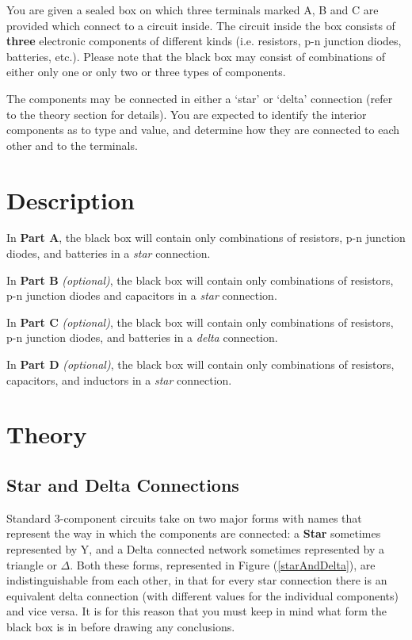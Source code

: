 You are given a sealed box on which three terminals marked A, B and C are provided which connect to a circuit inside. The circuit inside the box consists of \textbf{three} electronic components of different kinds (i.e. resistors, p-n junction diodes, batteries, etc.). Please note that the black box may consist of combinations of either only one or only two or three types of components. 

The components may be connected in either a `star' or `delta' connection (refer to the theory section for details). You are expected to identify the interior components as to type and value, and determine how they are connected to each other and to the terminals. 


\section*{Description}

In \textbf{Part A}, the black box will contain only combinations of resistors, p-n junction diodes, and batteries in a \textit{star} connection.

In \textbf{Part B} \textit{(optional)}, the black box will contain only combinations of resistors, p-n junction diodes and capacitors in a \textit{star} connection. 

In \textbf{Part C} \textit{(optional)}, the black box will contain only combinations of resistors, p-n junction diodes, and batteries in a \textit{delta} connection. 

In \textbf{Part D} \textit{(optional)}, the black box will contain only combinations of  resistors, capacitors, and inductors in a \textit{star} connection.


\section*{Theory}

\subsection*{Star and Delta Connections}

Standard 3-component circuits take on two major forms with names that represent the way in which the components are connected: a \textbf{Star} sometimes represented by Y, and a Delta connected network sometimes represented by a triangle or $\Delta$. Both these forms, represented in Figure (\ref{starAndDelta}), are indistinguishable from each other, in that for every star connection there is an equivalent delta connection (with different values for the individual components) and vice versa. It is for this reason that you must keep in mind what form the black box is in before drawing any conclusions.

